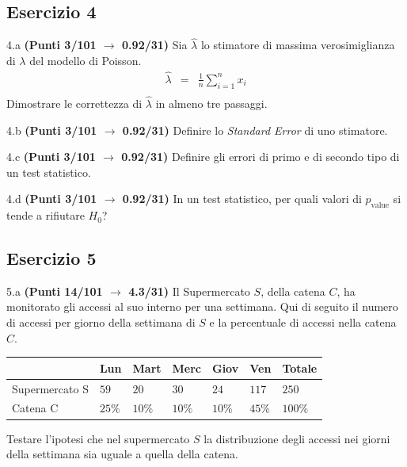\documentclass[
  11pt,
]{book}
\theoremstyle{mytheoremstyle}
\theoremstyle{mydefstyle}
\begin{document}
\subsection{Esercizio 4}\label{esercizio-4-9}

4.a \textbf{(Punti 3/101 \(\rightarrow\) 0.92/31)} Sia \(\hat \lambda\) lo stimatore di massima verosimiglianza di \(\lambda\) del modello di Poisson.
\begin{eqnarray*}
  \hat\lambda &=&  \frac 1n\sum_{i=1}^nx_i\\
\end{eqnarray*}
Dimostrare le correttezza di \(\hat\lambda\) in almeno tre passaggi.

4.b \textbf{(Punti 3/101 \(\rightarrow\) 0.92/31)} Definire lo \emph{Standard Error} di uno stimatore.

4.c \textbf{(Punti 3/101 \(\rightarrow\) 0.92/31)} Definire gli errori di primo e di secondo tipo di un test statistico.

4.d \textbf{(Punti 3/101 \(\rightarrow\) 0.92/31)} In un test statistico, per quali valori di \(p_\text{value}\) si tende a rifiutare \(H_0\)?

\subsection{Esercizio 5}\label{esercizio-5-8}

5.a \textbf{(Punti 14/101 \(\rightarrow\) 4.3/31)} Il Supermercato \(S\), della catena \(C\), ha monitorato gli accessi al suo interno per una settimana.
Qui di seguito il numero di accessi per giorno della settimana di \(S\) e la percentuale di accessi nella catena \(C\).

\begin{table}[H]
\centering
\begin{tabular}{lllllll}
\toprule
  & Lun & Mart & Merc & Giov & Ven & Totale\\
\midrule
Supermercato S & $59$ & $20$ & $30$ & $24$ & $117$ & $250$\\
Catena C & $25\%$ & $10\%$ & $10\%$ & $10\%$ & $45\%$ & $100\%$\\
\bottomrule
\end{tabular}
\end{table}

Testare l'ipotesi che nel supermercato \(S\) la distribuzione degli accessi nei giorni della settimana sia uguale a quella della catena.
\end{document}
